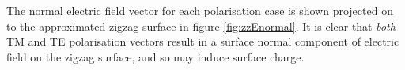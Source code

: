 The normal electric field vector for each polarisation case is shown projected on to the approximated zigzag surface in figure \ref{fig:zzEnormal}. It is clear that \textit{both} TM and TE polarisation vectors result in a surface normal component of electric field on the zigzag surface, and so may induce surface charge.

\begin{figure}
\begin{center}

\end{center}
\end{figure}
